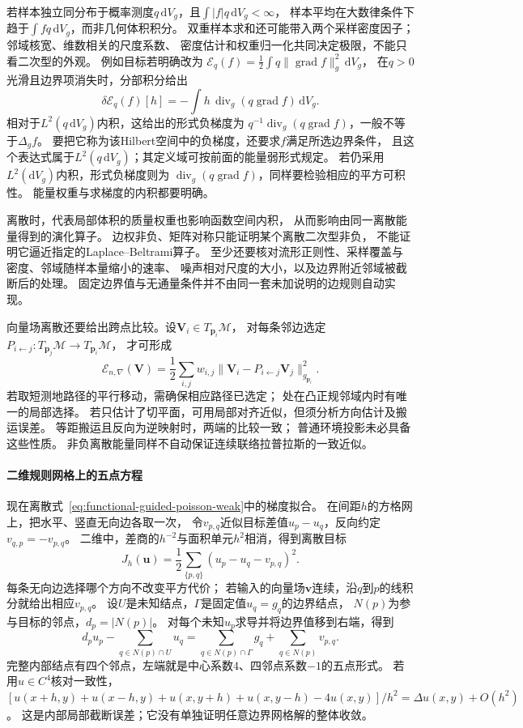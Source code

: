 若样本独立同分布于概率测度$q\,\mathrm dV_g$，且$\int|f|q\,\mathrm dV_g<\infty$，
样本平均在大数律条件下趋于$\int f q\,\mathrm dV_g$，而非几何体积积分。
双重样本求和还可能带入两个采样密度因子；邻域核宽、维数相关的尺度系数、
密度估计和权重归一化共同决定极限，不能只看二次型的外观。
例如目标若明确改为
$\mathcal E_q(f)=\frac12\int q\lVert\operatorname{grad}f\rVert_g^2\,\mathrm dV_g$，
在$q>0$光滑且边界项消失时，分部积分给出
\[
 \delta\mathcal E_q(f)[h]
 =-\int h\,\operatorname{div}_g(q\operatorname{grad}f)\,\mathrm dV_g.
\]
相对于$L^2(q\,\mathrm dV_g)$内积，这给出的形式负梯度为
$q^{-1}\operatorname{div}_g(q\operatorname{grad}f)$，一般不等于$\Delta_gf$。
要把它称为该Hilbert空间中的负梯度，还要求$f$满足所选边界条件，
且这个表达式属于$L^2(q\,\mathrm dV_g)$；其定义域可按前面的能量弱形式规定。
若仍采用$L^2(\mathrm dV_g)$内积，形式负梯度则为
$\operatorname{div}_g(q\operatorname{grad}f)$，同样要检验相应的平方可积性。
能量权重与求梯度的内积都要明确。

离散时，代表局部体积的质量权重也影响函数空间内积，
从而影响由同一离散能量得到的演化算子。
边权非负、矩阵对称只能证明某个离散二次型非负，
不能证明它逼近指定的Laplace--Beltrami算子。
至少还要核对流形正则性、采样覆盖与密度、邻域随样本量缩小的速率、
噪声相对尺度的大小，以及边界附近邻域被截断后的处理。
固定边界值与无通量条件并不由同一套未加说明的边规则自动实现。

向量场离散还要给出跨点比较。设$\bm V_i\in T_{\bm p_i}\mathcal M$，
对每条邻边选定$P_{i\leftarrow j}:T_{\bm p_j}\mathcal M\to T_{\bm p_i}\mathcal M$，
才可形成
\[
 \mathcal E_{n,\nabla}(\bm V)
 =\frac12\sum_{i,j}w_{i,j}
      \lVert\bm V_i-P_{i\leftarrow j}\bm V_j\rVert_{g_{\bm p_i}}^2.
\]
若取短测地路径的平行移动，需确保相应路径已选定；
处在凸正规邻域内时有唯一的局部选择。
若只估计了切平面，可用局部对齐近似，但须分析方向估计及搬运误差。
等距搬运且反向为逆映射时，两端的比较一致；
普通环境投影未必具备这些性质。
非负离散能量同样不自动保证连续联络拉普拉斯的一致近似。

\paragraph{二维规则网格上的五点方程}
现在离散式~\eqref{eq:functional-guided-poisson-weak}中的梯度拟合。
在间距$h$的方格网上，把水平、竖直无向边各取一次，
令$v_{p,q}$近似目标差值$u_p-u_q$，反向约定$v_{q,p}=-v_{p,q}$。
二维中，差商的$h^{-2}$与面积单元$h^2$相消，得到离散目标
\[
 J_h(\bm u)=\frac12\sum_{\{p,q\}}(u_p-u_q-v_{p,q})^2.
\]
每条无向边选择哪个方向不改变平方代价；
若输入的向量场$\bm v$连续，沿$q$到$p$的线积分就给出相应$v_{p,q}$。
设$U$是未知结点，$\Gamma$是固定值$u_q=g_q$的边界结点，
$N(p)$为参与目标的邻点，$d_p=|N(p)|$。
对每个未知$u_p$求导并将边界值移到右端，得到
\begin{equation}
 d_pu_p-\sum_{q\in N(p)\cap U}u_q
 =\sum_{q\in N(p)\cap\Gamma}g_q+\sum_{q\in N(p)}v_{p,q}.
 \label{eq:functional-grid-poisson-system}
\end{equation}
完整内部结点有四个邻点，左端就是中心系数$4$、四邻点系数$-1$的五点形式。
若用$u\in C^4$核对一致性，
$[u(x+h,y)+u(x-h,y)+u(x,y+h)+u(x,y-h)-4u(x,y)]/h^2
=\Delta u(x,y)+O(h^2)$。
这是内部局部截断误差；它没有单独证明任意边界网格解的整体收敛。

